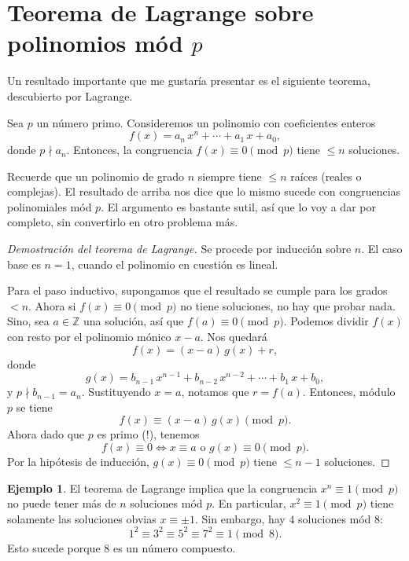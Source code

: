 \documentclass{article}
\newcommand{\ZZ}{\mathbb{Z}}
\theoremstyle{definition}
\newtheorem*{ejemplo}{Ejemplo}
\begin{document}

\section{Teorema de Lagrange sobre polinomios mód $p$}

Un resultado importante que me gustaría presentar es el siguiente teorema,
descubierto por Lagrange.

\begin{framed}
  Sea $p$ un número primo. Consideremos un polinomio con coeficientes enteros
  $$f (x) = a_n\,x^n + \cdots + a_1\,x + a_0,$$
  donde $p \nmid a_n$. Entonces, la congruencia $f (x) \equiv 0 \pmod{p}$ tiene
  $\le n$ soluciones.
\end{framed}

Recuerde que un polinomio de grado $n$ siempre tiene $\le n$ raíces
(reales o complejas). El resultado de arriba nos dice que lo mismo sucede con
congruencias polinomiales mód $p$.  El argumento es bastante sutil, así que
lo voy a dar por completo, sin convertirlo en otro problema más.

\begin{proof}[Demostración del teorema de Lagrange]
  Se procede por inducción sobre $n$. El caso base es $n = 1$, cuando el
  polinomio en cuestión es lineal.

  Para el paso inductivo, supongamos que el resultado se cumple para los grados
  $< n$. Ahora si $f (x) \equiv 0 \pmod{p}$ no tiene soluciones, no hay que
  probar nada. Sino, sea $a \in \ZZ$ una solución, así que
  $f (a) \equiv 0 \pmod{p}$. Podemos dividir $f (x)$ con resto por el polinomio
  mónico $x - a$. Nos quedará
  $$f (x) = (x-a)\,g(x) + r,$$
  donde
  $$g (x) = b_{n-1}\,x^{n-1} + b_{n-2}\,x^{n-2} + \cdots + b_1\,x + b_0,$$
  y $p \nmid b_{n-1} = a_n$. Sustituyendo $x = a$, notamos que
  $r = f (a)$. Entonces, módulo $p$ se tiene
  $$f (x) \equiv (x-a)\,g(x) \pmod{p}.$$
  Ahora dado que $p$ es primo (!), tenemos
  \[
    f (x) \equiv 0 \iff
    x \equiv a \text{ o }
    g (x) \equiv 0 \pmod{p}.
  \]
  Por la hipótesis de inducción, $g (x) \equiv 0 \pmod{p}$ tiene $\le n-1$
  soluciones.
\end{proof}

\begin{ejemplo}
  El teorema de Lagrange implica que la congruencia $x^n \equiv 1 \pmod{p}$
  no puede tener más de $n$ soluciones mód $p$. En particular,
  $x^2 \equiv 1 \pmod{p}$ tiene solamente las soluciones obvias
  $x \equiv \pm 1$. Sin embargo, hay $4$ soluciones mód $8$:
  $$1^2 \equiv 3^2 \equiv 5^2 \equiv 7^2 \equiv 1 \pmod{8}.$$
  Esto sucede porque $8$ es un número compuesto.
\end{ejemplo}
\end{document}
